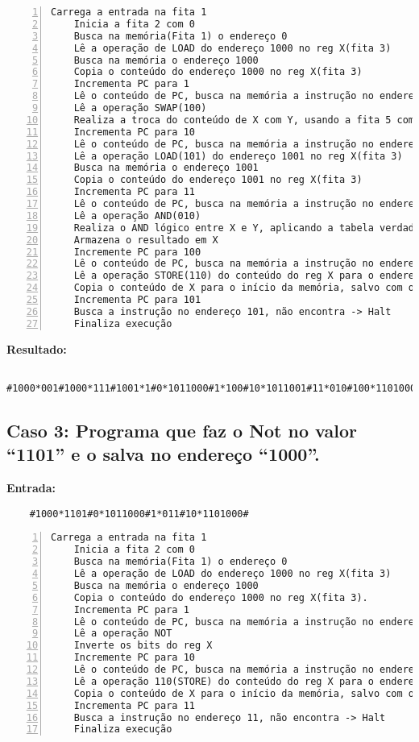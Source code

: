 \documentclass[a4paper,12pt]{article}
\begin{document}
\begin{Verbatim}[numbers=left,xleftmargin=1mm]
    Carrega a entrada na fita 1
    Inicia a fita 2 com 0
    Busca na memória(Fita 1) o endereço 0
    Lê a operação de LOAD do endereço 1000 no reg X(fita 3)
    Busca na memória o endereço 1000
    Copia o conteúdo do endereço 1000 no reg X(fita 3)
    Incrementa PC para 1
    Lê o conteúdo de PC, busca na memória a instrução no endereço 1
    Lê a operação SWAP(100)
    Realiza a troca do conteúdo de X com Y, usando a fita 5 como mediadora
    Incrementa PC para 10
    Lê o conteúdo de PC, busca na memória a instrução no endereço 10
    Lê a operação LOAD(101) do endereço 1001 no reg X(fita 3)
    Busca na memória o endereço 1001
    Copia o conteúdo do endereço 1001 no reg X(fita 3)
    Incrementa PC para 11
    Lê o conteúdo de PC, busca na memória a instrução no endereço 11
    Lê a operação AND(010)
    Realiza o AND lógico entre X e Y, aplicando a tabela verdade
    Armazena o resultado em X
    Incremente PC para 100
    Lê o conteúdo de PC, busca na memória a instrução no endereço 100
    Lê a operação STORE(110) do conteúdo do reg X para o endereço 1000
    Copia o conteúdo de X para o início da memória, salvo com o endereço 1000
    Incrementa PC para 101
    Busca a instrução no endereço 101, não encontra -> Halt
    Finaliza execução
\end{Verbatim}

\textbf{Resultado:}
\begin{verbatim}
    #1000*001#1000*111#1001*1#0*1011000#1*100#10*1011001#11*010#100*1101000#
\end{verbatim}

\newpage
\subsection*{Caso 3: Programa que faz o Not no valor “1101” e o salva no endereço “1000”.}
\textbf{Entrada:}
\begin{verbatim}
    #1000*1101#0*1011000#1*011#10*1101000#
\end{verbatim}

\begin{Verbatim}[numbers=left,xleftmargin=1mm]
    Carrega a entrada na fita 1
    Inicia a fita 2 com 0
    Busca na memória(Fita 1) o endereço 0
    Lê a operação de LOAD do endereço 1000 no reg X(fita 3)
    Busca na memória o endereço 1000
    Copia o conteúdo do endereço 1000 no reg X(fita 3).
    Incrementa PC para 1
    Lê o conteúdo de PC, busca na memória a instrução no endereço 1
    Lê a operação NOT
    Inverte os bits do reg X
    Incremente PC para 10
    Lê o conteúdo de PC, busca na memória a instrução no endereço 10
    Lê a operação 110(STORE) do conteúdo do reg X para o endereço 1000
    Copia o conteúdo de X para o início da memória, salvo com o endereço 1000
    Incrementa PC para 11
    Busca a instrução no endereço 11, não encontra -> Halt
    Finaliza execução
\end{Verbatim}
\end{document}
